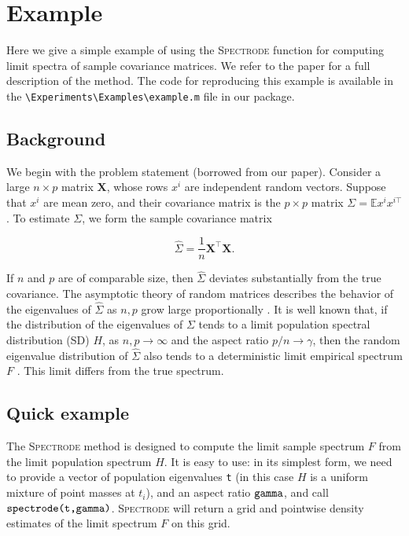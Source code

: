 \documentclass[english,11pt]{article} %
\begin{document}
\section{Example}
\label{example}

Here we give a simple example of using the \textsc{Spectrode} function for computing limit spectra of sample covariance matrices. We refer to the paper \cite{dobriban2015efficient} for a full description of the method. The code for reproducing this example is available in the \verb+\Experiments\Examples\example.m+ file in our package. 

\subsection{Background}

We begin with the problem statement (borrowed from our paper). Consider a large $n \times p$ matrix $\mathbf{X}$, whose rows $x^i$ are independent random vectors. Suppose that $x^i$ are mean zero, and their covariance matrix is the $p \times p$ matrix $\Sigma = \mathbb{E}{x^i x^{i\top}}$. To estimate $\Sigma$, we form the sample covariance matrix

$$
\widehat{\Sigma} = \frac{1}{n} \mathbf{X}^\top \mathbf{X}.
$$

If $n$ and $p$ are of comparable size, then $\widehat{\Sigma}$ deviates substantially from the true covariance. The asymptotic theory of random matrices describes the behavior of the eigenvalues of $\widehat{\Sigma}$ as $n,p$ grow large proportionally \citep[e.g.][]{bai2009spectral}. It is well known that, if the distribution of the eigenvalues of $\Sigma$ tends to a limit population spectral distribution (SD) $H$, as $n,p \to \infty$ and the aspect ratio $p/n \to \gamma$, then the random eigenvalue distribution of $\widehat{\Sigma}$ also tends to a deterministic limit empirical spectrum $F$ \citep{marchenko1967distribution,silverstein1995strong}. This limit differs from the true spectrum.

\subsection{Quick example}

The \textsc{Spectrode} method is designed to compute the limit sample spectrum $F$ from the limit population spectrum $H$. It is easy to use: in its simplest form, we need to provide a vector of population eigenvalues \verb+t+ (in this case $H$ is a uniform mixture of point masses at $t_i$), and an aspect ratio $\verb+gamma+$, and call $\verb+spectrode(t,gamma)+$. \textsc{Spectrode} will return a grid and pointwise density estimates of the limit spectrum $F$ on this grid. 
\end{document}
